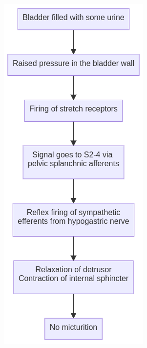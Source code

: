 \documentclass[
  12pt,
]{memoir}
\begin{document}
\begin{figure}
    \centering
    \begin{subfigure}{.4\textwidth}
        \includegraphics[width=\textwidth]{../assets/med/mic-part.png}

\end{subfigure}
\end{figure}
\end{document}
